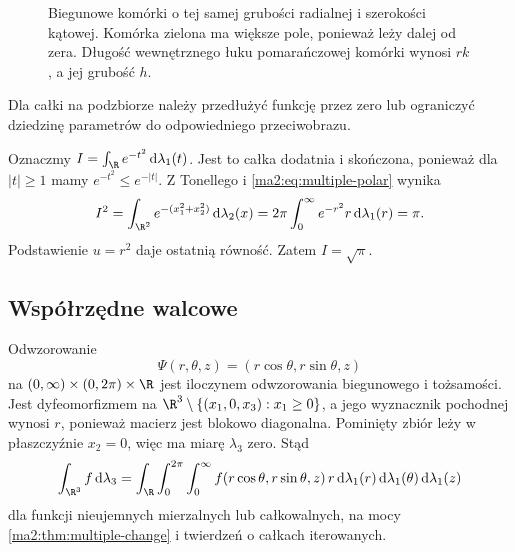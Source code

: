 \begin{figure}[htbp]
\centering
{}
\caption{Biegunowe komórki o tej samej grubości
radialnej i szerokości kątowej. Komórka zielona
ma większe pole, ponieważ leży dalej od zera.
Długość wewnętrznego łuku pomarańczowej
komórki wynosi $rk$, a jej grubość $h$.}
\label{ma2:fig:multiple-polar-cell}
\end{figure}

Dla całki na podzbiorze należy przedłużyć
funkcję przez zero lub ograniczyć dziedzinę
parametrów do odpowiedniego przeciwobrazu.

\begin{przyklad}
\label{ma2:ex:multiple-gaussian}
Oznaczmy $I=\int_\R e^{-t^2}\,\mathrm d\lambda_1(t)$.
Jest to całka dodatnia i skończona, ponieważ
dla $|t|\ge1$ mamy $e^{-t^2}\le e^{-|t|}$.
Z Tonellego i \ref{ma2:eq:multiple-polar}
wynika
\[
 I^2=\int_{\R^2}e^{-(x_1^2+x_2^2)}\,\mathrm d\lambda_2(x)
 =2\pi\int_0^\infty e^{-r^2}r\,\mathrm d\lambda_1(r)=\pi.
\]
Podstawienie $u=r^2$ daje ostatnią równość.
Zatem $I=\sqrt\pi$.
\end{przyklad}

\subsection{Współrzędne walcowe}

Odwzorowanie
\[
 \Psi(r,\theta,z)=(r\cos\theta,r\sin\theta,z)
\]
na $(0,\infty)\times(0,2\pi)\times\R$
jest iloczynem odwzorowania biegunowego
i tożsamości. Jest dyfeomorfizmem na
$\R^3\setminus\{(x_1,0,x_3):x_1\ge0\}$,
a jego wyznacznik pochodnej wynosi $r$,
ponieważ macierz jest blokowo diagonalna.
Pominięty zbiór leży w płaszczyźnie $x_2=0$,
więc ma miarę $\lambda_3$ zero. Stąd
\[
 \int_{\R^3} f\,\mathrm d\lambda_3
 =\int_\R\int_0^{2\pi}\int_0^\infty
 f(r\cos\theta,r\sin\theta,z)\,r\,
 \mathrm d\lambda_1(r)\,\mathrm d\lambda_1(\theta)\,
 \mathrm d\lambda_1(z)
\]
dla funkcji nieujemnych mierzalnych lub całkowalnych,
na mocy \ref{ma2:thm:multiple-change}
i twierdzeń o całkach iterowanych.

